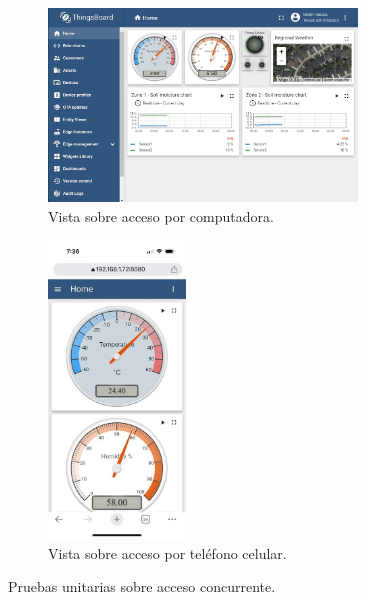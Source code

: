 \begin{figure}[htpb]
     \centering
       \begin{subfigure}[b]{0.53\textwidth}
	    \centering
		 \includegraphics[width=0.9\textwidth]{./Figures/chapter4/tb_compu.jpg}
		\caption{Vista sobre acceso por computadora.}
		\label{fig:tb_compu}
     \end{subfigure}
          \hfill
     \begin{subfigure}[b]{0.45\textwidth}
		\centering
		\includegraphics[width=0.40\textwidth]{./Figures/chapter4/tb_celu.jpg}
		\caption{Vista sobre acceso por teléfono celular.}
		\label{fig:tb_celu}
     \end{subfigure}
     \hfill
        \caption[Pruebas unitarias sobre acceso concurrente]{Pruebas unitarias sobre acceso concurrente.}
        \label{fig:tb_concurrencia}
\end{figure}

